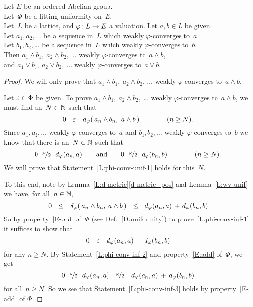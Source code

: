 \documentclass[main.tex]{subfiles}
\begin{document}
%
%
\begin{lem}
\label{L:phi-conv-inf}
Let $E$ be an ordered Abelian group.\\
Let~$\Phi$ be a fitting uniformity on~$E$.\\
Let~$L$ be a lattice, and $\varphi\colon L\rightarrow E$ a valuation.
Let $a,b\in L$ be given.\\
Let $a_1,a_2,\dotsc$ 
be a sequence in~$L$ which weakly $\varphi$-converges to~$a$.\\
Let $b_1,b_2,\dotsc$
be a sequence in~$L$ which weakly $\varphi$-converges to~$b$.\\
Then $a_1\wedge b_1,\ a_2\wedge b_2,\ \dotsc$
weakly $\varphi$-converges to~$a\wedge b$,\\
and $a_1\vee b_1,\ a_2\vee b_2,\ \dotsc$
weakly $\varphi$-converges to~$a\vee b$.
\end{lem}
\begin{proof}
We will only prove that $a_1\wedge b_1,\ a_2\wedge b_2,\ \dotsc$
weakly $\varphi$-converges to~$a\wedge b$.

Let $\varepsilon \in \Phi$ be given.
To prove  $a_1\wedge b_1,\ a_2\wedge b_2,\ \dotsc$
weakly $\varphi$-converges to~$a\wedge b$,
we must find an~$N\in\mathbb{N}$
 such that 
\begin{equation}
\label{L:phi-conv-inf-1}
0\quad \varepsilon\quad d_{\smash{\varphi}}(\,a_n\wedge b_n,\ a\wedge b\,)
\qquad\qquad(n\geq N).
\end{equation}
Since $a_1,a_2, \dotsc$ weakly $\varphi$-converges to~$a$
and $b_1,b_2,\dotsc$ weakly $\varphi$-converges to~$b$
we know
that there is an~$N\in\mathbb{N}$ such that 
\begin{equation}
\label{L:phi-conv-inf-2}
0\ \ \smash{\nicefrac{\textstyle{\varepsilon}}{2}}\ \ d_{\smash{\varphi}}(a_n, a)
\qquad\text{and}\qquad
0\ \ \smash{\nicefrac{\textstyle{\varepsilon}}{2}}\ \ d_{\smash{\varphi}}(b_n,b)
\qquad\qquad(n\geq N).
\end{equation}
We will prove that Statement~\eqref{L:phi-conv-unif-1}
holds for this~$N$.

To this end, note by Lemma~\ref{L:d-metric}\ref{d-metric_pos}
and Lemma~\ref{L:wv-unif} we have, for all~$n\in \mathbb{N}$,
\begin{equation*}
0 \ \ \leq\ \ 
\ld\varphi(\,a_n\wedge b_n,\ a\wedge b\,)
\ \ \leq\ \ 
\ld\varphi(a_n, a) \,+\,
\ld\varphi(b_n, b)
\end{equation*}
So by property~\ref{E-ord} of~$\Phi$
(see Def.~\ref{D:uniformity})
to prove~\eqref{L:phi-conv-inf-1}
it suffices to show  that
\begin{equation}
\label{L:phi-conv-inf-3}
0\quad\varepsilon\quad
d_{\smash{\varphi}}(a_n, a) \,+\,
d_{\smash{\varphi}}(b_n, b)
\end{equation}
for any $n\geq N$.
By Statement~\eqref{L:phi-conv-inf-2} 
and property~\ref{E:add} of~$\Phi$, we get
\begin{equation*}
0 
\ \ \dt\ve  \ \ 
\ld\varphi(a_n, a)
\quad \dt\ve \quad
\ld\varphi(a_n, a) \,+\,
\ld\varphi(b_n, b)
\end{equation*}
for all~$n\geq N$. 
So we see that Statement~\eqref{L:phi-conv-inf-3} 
holds by property~\ref{E-add} of $\Phi$.
\end{proof}
\end{document}
